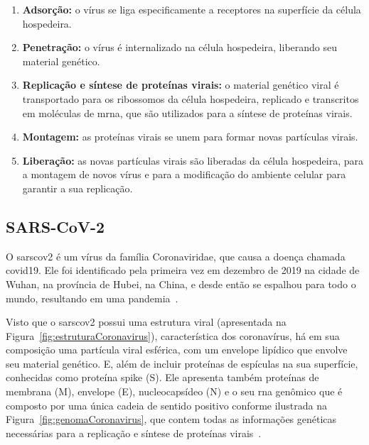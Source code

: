\begin{enumerate}
  \item \textbf{Adsorção:} o vírus se liga especificamente a receptores na superfície da célula hospedeira.
  \item \textbf{Penetração:} o vírus é internalizado na célula hospedeira, liberando seu material genético.
  \item \textbf{Replicação e síntese de proteínas virais:} o material genético viral é transportado para os ribossomos da célula hospedeira, replicado e transcritos em moléculas de \gls{mrna}, que são utilizados para a síntese de proteínas virais.
  \item \textbf{Montagem:} as proteínas virais se unem para formar novas partículas virais.
  \item \textbf{Liberação:} as novas partículas virais são liberadas da célula hospedeira, para a montagem de novos vírus e para a modificação do ambiente celular para garantir a sua replicação.
\end{enumerate}

\subsection{SARS-CoV-2}

O \gls{sarscov2} é um vírus da família Coronaviridae, que causa a doença chamada \gls{covid19}. Ele foi identificado pela primeira vez em dezembro de 2019 na cidade de Wuhan, na província de Hubei, na China, e desde então se espalhou para todo o mundo, resultando em uma pandemia~\cite{zhu_novel_2020,wu_coronavirus_2020}.

Visto que o \gls{sarscov2} possui uma estrutura viral (apresentada na Figura~\ref{fig:estruturaCoronavirus}), característica dos coronavírus, há em sua composição uma partícula viral esférica, com um envelope lipídico que envolve seu material genético. E, além de incluir proteínas de espículas na sua superfície, conhecidas como proteína spike (S). Ele apresenta também proteínas de membrana (M), envelope (E), nucleocapsídeo (N) e o seu \gls{rna} genômico que é composto por uma única cadeia de sentido positivo conforme ilustrada na Figura~\ref{fig:genomaCoronavirus}, que contem todas as informações genéticas necessárias para a replicação e síntese de proteínas virais~\cite{covid19_cascella_2020}.

